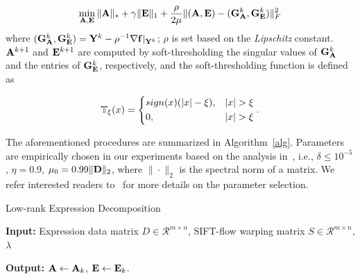\documentclass[journal]{IEEEtran}
\begin{document}
\begin{equation} \label{eq:apg_fast}
\min_{\A,\E} \|\A\|_* + \gamma \|\E\|_1 + \frac{\rho}{2\mu}\|(\A,\E)-(\G^k_\A,\G^k_\E)\|^2_F
\end{equation}
where $({\bf G}^k_{\bf A},{\bf G}^k_{\bf E})={\bf Y}^k-\rho^{-1}\nabla {\bf f}|_{{\bf Y}^k}$; $\rho$ is set based on the \textit{Lipschitz} constant. ${\bf A}^{k+1}$ and ${\bf E}^{k+1}$ are computed by soft-thresholding the singular values of ${\bf G}^k_{\bf A}$ and the entries of ${\bf G}^k_{\bf E}$, respectively, and the soft-thresholding function is defined as

\begin{equation}
\mathbb{T}_\xi(x)=
	\begin{dcases}
    sign(x)(|x|-\xi),  	& |x|>\xi \\
    0,  								& |x|>\xi
	\end{dcases}.
\end{equation}

The aforementioned procedures are summarized in Algorithm~\ref{alg}. Parameters are empirically chosen in our experiments based on the analysis in~\cite{Lin09}, i.e., $\delta\leq10^{-5}$, $\eta=0.9$, $\mu_0=0.99\|{\bf D}\|_2$, where $\|\cdot\|_2$ is the spectral norm of a matrix. We refer interested readers to~\cite{Lin09} for more details on the parameter selection. 

\begin{algorithm}[htb]
    \caption{Low-rank Expression Decomposition}
    \textbf{Input:} Expression data matrix $D\in \mathscr{R}^{m\times n}$, SIFT-flow warping matrix $S\in \mathscr{R}^{m\times n}$, $\lambda$ \\
    \begin{algorithmic}[1]
			\State{$\D^*=\D+\S$}
				
				
				
			\EndWhile
    \end{algorithmic}
    \textbf{Output:} ${\bf A}\leftarrow {\bf A}_k$, ${\bf E}\leftarrow {\bf E}_k$. \\
    \label{alg}
\end{algorithm}
\end{document}
